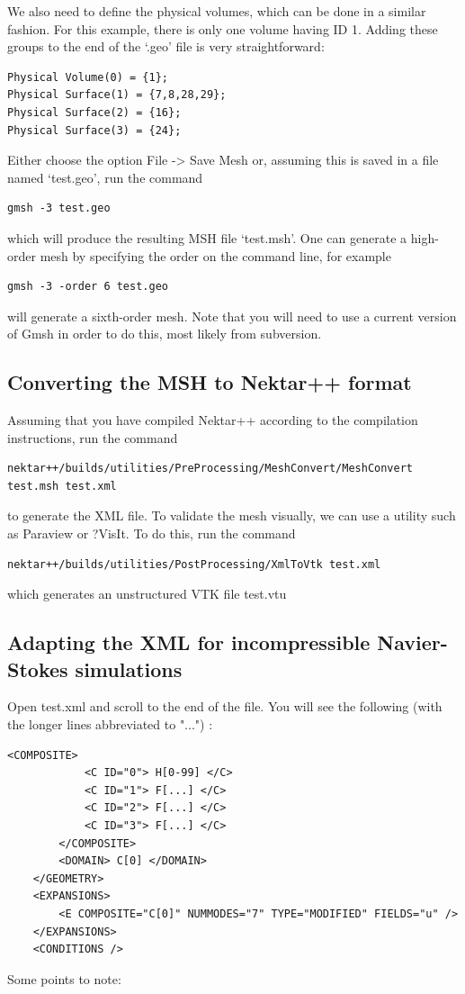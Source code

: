 We also need to define the physical volumes, which can be done in a similar fashion. For this example, there is only one volume having ID 1. Adding these groups to the end of the `.geo' file is very straightforward:

\begin{lstlisting}[style=XmlStyle]
Physical Volume(0) = {1};
Physical Surface(1) = {7,8,28,29};
Physical Surface(2) = {16};
Physical Surface(3) = {24};
\end{lstlisting}
Either choose the option File -> Save Mesh or, assuming this is saved in a file named `test.geo', run the command
\begin{lstlisting}[style=XmlStyle]
gmsh -3 test.geo
\end{lstlisting}
which will produce the resulting MSH file `test.msh'. One can generate a high-order mesh by specifying the order on the command line, for example
\begin{lstlisting}[style=XmlStyle]
gmsh -3 -order 6 test.geo
\end{lstlisting}
will generate a sixth-order mesh. Note that you will need to use a current version of Gmsh in order to do this, most likely from subversion.
\subsection{Converting the MSH to Nektar++ format}
Assuming that you have compiled Nektar++ according to the compilation instructions, run the command
\begin{lstlisting}[style=XmlStyle]
nektar++/builds/utilities/PreProcessing/MeshConvert/MeshConvert test.msh test.xml
\end{lstlisting}
to generate the XML file. To validate the mesh visually, we can use a utility such as Paraview or ?VisIt. To do this, run the command
\begin{lstlisting}[style=XmlStyle]
nektar++/builds/utilities/PostProcessing/XmlToVtk test.xml
\end{lstlisting}
which generates an unstructured VTK file test.vtu
\subsection{Adapting the XML for incompressible Navier-Stokes simulations}
Open test.xml and scroll to the end of the file. You will see the following (with the longer lines abbreviated to "...") :
\begin{lstlisting}[style=XmlStyle]
     <COMPOSITE>
            <C ID="0"> H[0-99] </C>
            <C ID="1"> F[...] </C>
            <C ID="2"> F[...] </C>
            <C ID="3"> F[...] </C>
        </COMPOSITE>
        <DOMAIN> C[0] </DOMAIN>
    </GEOMETRY>
    <EXPANSIONS>
        <E COMPOSITE="C[0]" NUMMODES="7" TYPE="MODIFIED" FIELDS="u" />
    </EXPANSIONS>
    <CONDITIONS />
\end{lstlisting}
    Some points to note:


